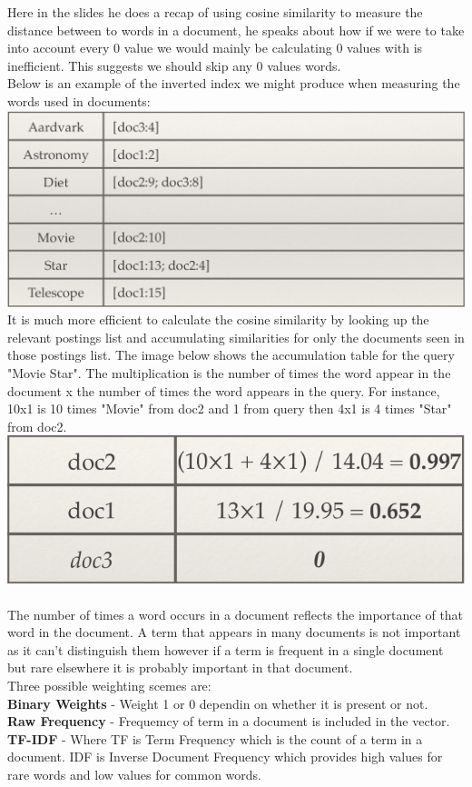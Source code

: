 \documentclass{article}
\begin{document}
	Here in the slides he does a recap of using cosine similarity to measure the distance between to words in a document, he speaks about how if we were to take into account every 0 value we would mainly be calculating 0 values with is inefficient. This suggests we should skip any 0 values words.\\Below is an example of the inverted index we might produce when measuring the words used in documents:\\
	\includegraphics[scale=0.38]{inverted_index}
	It is much more efficient to calculate the cosine similarity by looking up the relevant postings list and accumulating similarities for only the documents seen in those postings list.
	The image below shows the accumulation table for the query "Movie Star". The multiplication is the number of times the word appear in the document x the number of times the word appears in the query. For instance, 10x1 is 10 times "Movie" from doc2 and 1 from query then 4x1 is 4 times "Star" from doc2.\\
	\includegraphics[scale=0.38]{accumulation_table}\\
	\\The number of times a word occurs in a document reflects the importance of that word in the document. A term that appears in many documents is not important as it can't distinguish them however if a term is frequent in a single document but rare elsewhere it is probably important in that document.\\
	Three possible weighting scemes are:\\{\bfseries Binary Weights} - Weight 1 or 0 dependin on whether it is present or not.\\
	{\bfseries Raw Frequency} - Frequemcy of term in a document is included in the vector.\\
	{\bfseries TF-IDF} - Where TF is Term Frequency which is the count of a term in a document. IDF is Inverse Document Frequency which provides high values for rare words and low values for common words.
	
\end{document}
